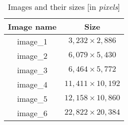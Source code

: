 \begin{table}[h]
\caption{Images and their sizes [in {\em pixels}]}
\centering
\begin{tabular}{c c} 
\hline\hline
Image name & Size\\ [0.5ex] 
\hline 
image\_1 & $3,232 \times 2,886 $\\
image\_2 & $6,079 \times 5,430$ \\
image\_3 & $6,464 \times 5,772$ \\
image\_4 & $11,411 \times 10,192$ \\
image\_5 & $12,158 \times 10,860 $\\ 
image\_6 & $22,822 \times 20,384 $\\
[1ex]
\hline
\end{tabular}
\label{table:sequ} 
\end{table}
